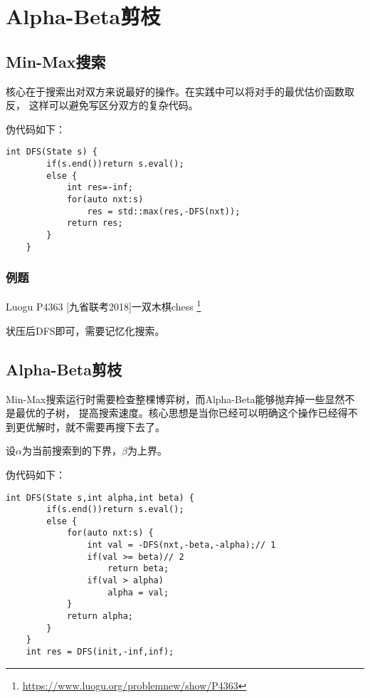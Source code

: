 \section{Alpha-Beta剪枝}

\subsection{Min-Max搜索}


核心在于搜索出对双方来说最好的操作。在实践中可以将对手的最优估价函数取反，
这样可以避免写区分双方的复杂代码。

伪代码如下：
\begin{lstlisting}[title=Min-Max Search]
    int DFS(State s) {
        if(s.end())return s.eval();
        else {
            int res=-inf;
            for(auto nxt:s)
                res = std::max(res,-DFS(nxt));
            return res;
        }
    }
\end{lstlisting}

\subsubsection{例题}

Luogu P4363 [九省联考2018]一双木棋chess
\footnote{\url{https://www.luogu.org/problemnew/show/P4363}}

状压后DFS即可，需要记忆化搜索。



\subsection{Alpha-Beta剪枝}


Min-Max搜索运行时需要检查整棵博弈树，而Alpha-Beta能够抛弃掉一些显然不是最优的子树，
提高搜索速度。核心思想是当你已经可以明确这个操作已经得不到更优解时，就不需要再搜下去了。

设$\alpha$为当前搜索到的下界，$\beta$为上界。

伪代码如下：
\begin{lstlisting}[title=Alpha-Beta 剪枝]
    int DFS(State s,int alpha,int beta) {
        if(s.end())return s.eval();
        else {
            for(auto nxt:s) {
                int val = -DFS(nxt,-beta,-alpha);// 1
                if(val >= beta)// 2
                    return beta;
                if(val > alpha)
                    alpha = val;
            }
            return alpha;
        }
    }
    int res = DFS(init,-inf,inf);
\end{lstlisting}

